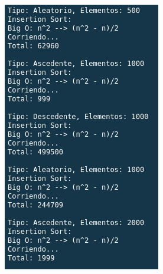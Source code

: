 \documentclass{article}
\begin{document}
			\begin{figure}[H]
				\begin{multicols}{2}
					\includegraphics[width = \linewidth]{images/e3-5}\par

\end{multicols}
\end{figure}
\end{document}
